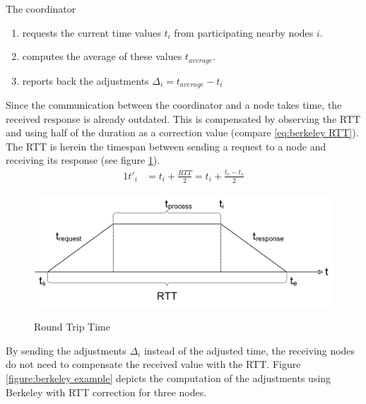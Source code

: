 		\noindent The coordinator
		\vspace{-\topsep}
		\begin{enumerate}
			\itemsep-0.5em
			\item requests the current time values $t_i$ from participating nearby nodes $i$.
			\item computes the average of these values $t_{average}$.
			\item reports back the adjustments $\Delta_{i}=t_{average}-t_i$
		\end{enumerate}
	
		Since the communication between the coordinator and a node takes time, the received response is already outdated. This is compensated by observing the \gls{RTT} and using half of the duration as a correction value (compare \ref{eq:berkeley RTT}). The \gls{RTT} is herein the timespan between sending a request to a node and receiving its response (see figure \ref{figure:berkeley RTT}).
		\begin{alignat}{1}
		t'_i &=t_i+\frac{RTT}{2}=t_i+\frac{t_e-t_s}{2} \label{eq:berkeley RTT}
		\end{alignat}
		
		\begin{figure}[!htbp] %
			\caption{Round Trip Time}
			\includegraphics[scale=1.0]{figures/berkeley.png}
			\label{figure:berkeley RTT}
		\end{figure}
		
		 By sending the adjustments $\Delta_i$ instead of the adjusted time, the receiving nodes do not need to compensate the received value with the \gls{RTT}. Figure \ref{figure:berkeley example} depicts the computation of the adjustments using Berkeley with \gls{RTT} correction for three nodes. 
		
